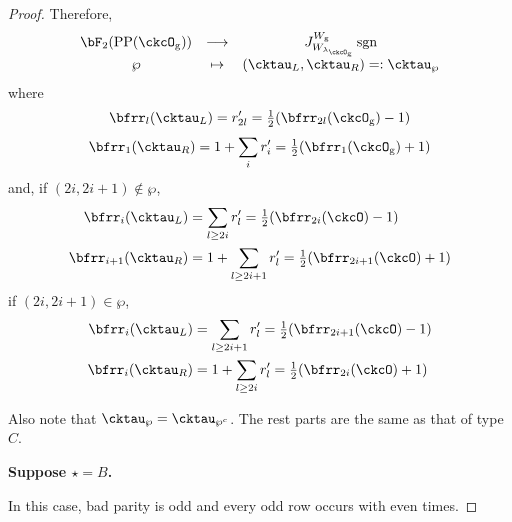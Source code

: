 \documentclass[12pt,a4paper]{amsart}
\newcommand{\sgn}{\operatorname{sgn}}
\numberwithin{equation}{section}
\theoremstyle{remark}
\def\half{{\tfrac{1}{2}}}
\def\lamckg{\lambda_{\ckcO_{\mathrm g}}}
\def\CPP{\mathrm{PP}}
\begin{document}
\begin{proof}
{{      Therefore,
      \[
        \begin{array}{ccc}
          \bF_{2}(\CPP(\ckcO_{\mathrm g}))&\longrightarrow
          & J_{W_{\lamckg}}^{W_{\mathrm g}} \sgn \\
          \wp&\mapsto&    (\cktau_{L},\cktau_{R}) =:\cktau_{\wp}
        \end{array}
      \]
      where
      \[
        \bfrr_{l}(\cktau_{L}) = r'_{2l} = \half (\bfrr_{2l}(\ckcO_{\mathrm g})-1)
      \]
      \[
        \bfrr_{1}(\cktau_{R}) = 1+ \sum_{i} r'_{i} = \half (\bfrr_{1}(\ckcO_{\mathrm g})+1)
      \]
      and, if $(2i,2i+1)\notin \wp$,
      \[
        \begin{split}
          \bfrr_{i}(\cktau_{L}) & = \sum_{l\geq 2i} r'_{l}
          = \half(\bfrr_{2i}(\ckcO)-1)\\
          \bfrr_{i+1}(\cktau_{R}) & = 1 + \sum_{l\geq 2i+1} r'_{l} = \half(\bfrr_{2i+1}(\ckcO)+1)
        \end{split}
      \]
      if $(2i,2i+1)\in \wp$,
      \[
        \begin{split}
          \bfrr_{i}(\cktau_{L}) & = \sum_{l\geq 2i+1} r'_{l}
          = \half(\bfrr_{2i+1}(\ckcO)-1)\\
          \bfrr_{i}(\cktau_{R}) & = 1 + \sum_{l\geq 2i} r'_{l} = \half(\bfrr_{2i}(\ckcO)+1)
        \end{split}
      \]

      Also note that $\cktau_{\wp}=\cktau_{\wp^{c}}$. The rest parts are the
      same as that of type $C$.

      {\bf Suppose $\star=B$. }

      In this case, bad parity is odd and every odd row occurs with even
      times.

}}
\end{proof}
\end{document}
